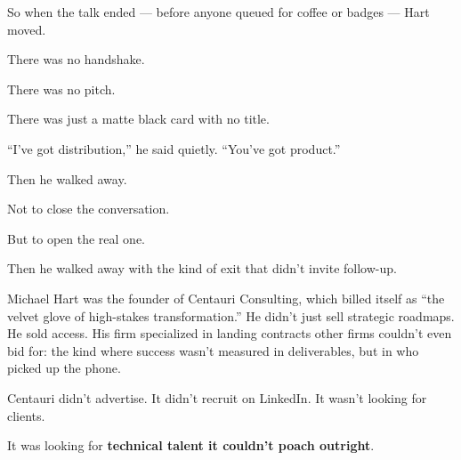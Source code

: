 So when the talk ended --- before anyone queued for coffee or badges --- Hart moved.

There was no handshake. 

There was no pitch. 

There was just a matte black card with no title.

``I’ve got distribution,'' 
he said quietly. 
``You’ve got product.''

Then he walked away.

Not to close the conversation.

But to open the real one.

Then he walked away with the kind of exit that didn’t invite follow-up.





Michael Hart was the founder of Centauri Consulting, which billed itself as 
``the velvet glove of high-stakes transformation.''
He didn’t just sell strategic roadmaps. He sold access. His firm specialized in landing contracts other firms 
couldn’t even bid for: the kind where success wasn’t measured in deliverables, but in who picked up the phone.

Centauri didn’t advertise. It didn’t recruit on LinkedIn. It wasn’t looking for clients.

It was looking for \textbf{technical talent it couldn’t poach outright}.


\medskip


